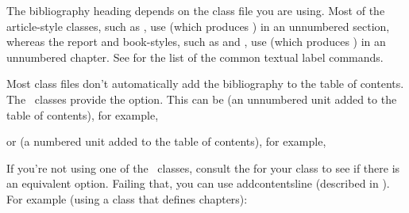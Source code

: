 The bibliography heading depends on the class file you are using.
Most of the article-style classes, such as , use
 (which produces ) in an unnumbered
section, whereas the report and book-styles, such as 
and , use  (which produces
\dq{\bibname}) in an unnumbered chapter. See
 for the list of the common textual label
commands.

Most class files don't automatically add the bibliography to the
table of contents. The \koma\ classes provide the
 option. This can be
 (an unnumbered unit added to the
table of contents), for example,
\begin{codeS}
\end{codeS}
or  (a
numbered unit added to the table of contents), for example,
\begin{codeS}
\end{codeS}
If you're not using
one of the \koma\ classes, consult the 
 for your class to see if
there is an equivalent option. Failing that, you can use
\gls{addcontentsline} (described in ).
For example (using a class that defines chapters):
\begin{code}
\\
\end{code}

